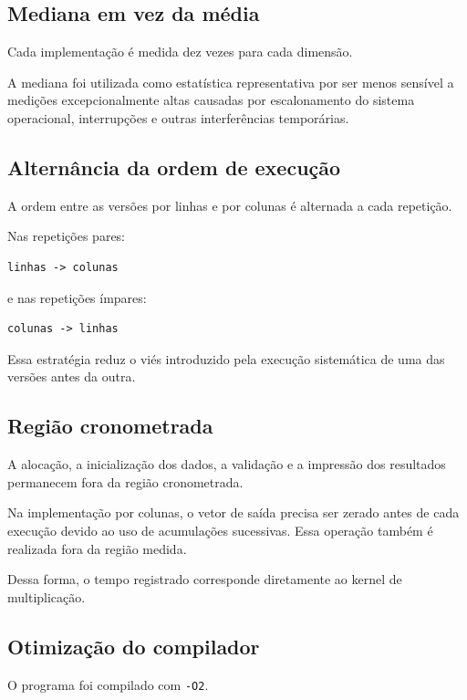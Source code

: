 \subsection{Mediana em vez da média}

Cada implementação é medida dez vezes para cada dimensão.

A mediana foi utilizada como estatística representativa por ser menos
sensível a medições excepcionalmente altas causadas por escalonamento do
sistema operacional, interrupções e outras interferências temporárias.


\subsection{Alternância da ordem de execução}

A ordem entre as versões por linhas e por colunas é alternada a cada
repetição.

Nas repetições pares:

\begin{verbatim}
linhas -> colunas
\end{verbatim}

e nas repetições ímpares:

\begin{verbatim}
colunas -> linhas
\end{verbatim}

Essa estratégia reduz o viés introduzido pela execução sistemática de
uma das versões antes da outra.


\subsection{Região cronometrada}

A alocação, a inicialização dos dados, a validação e a impressão dos
resultados permanecem fora da região cronometrada.

Na implementação por colunas, o vetor de saída precisa ser zerado antes
de cada execução devido ao uso de acumulações sucessivas. Essa operação
também é realizada fora da região medida.

Dessa forma, o tempo registrado corresponde diretamente ao kernel de
multiplicação.


\subsection{Otimização do compilador}

O programa foi compilado com \texttt{-O2}.

